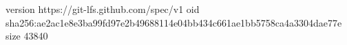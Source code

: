 version https://git-lfs.github.com/spec/v1
oid sha256:ae2ac1e8e3ba99fd97e2b49688114e04bb434c661ae1bb5758ca4a3304dae77e
size 43840
